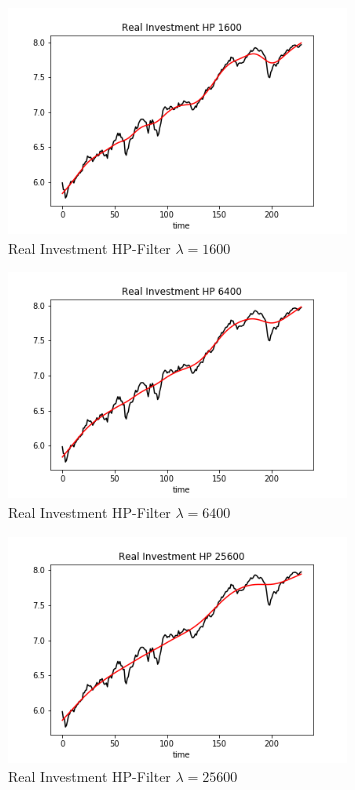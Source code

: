 \documentclass[letterpaper,11pt]{article}
\theoremstyle{definition}
\begin{document}
\begin{spacing}{1.5}
\begin{Exercise}
				\begin{figure}[H]
					\caption{Real Investment HP-Filter $\lambda=1600$}
					\label{fig:real_IN1600}
					\includegraphics[width=0.8\textwidth]{Real_IN_HP1600.png}
				\end{figure}

				\begin{figure}[H]
					\caption{Real Investment HP-Filter $\lambda=6400$}
					\label{fig:real_IN6400}
					\includegraphics[width=0.8\textwidth]{Real_IN_HP6400.png}
				\end{figure}

				\begin{figure}[H]
					\caption{Real Investment HP-Filter $\lambda=25600$}
					\label{fig:real_IN25600}
					\includegraphics[width=0.8\textwidth]{Real_IN_HP25600.png}
				\end{figure}
    \end{Exercise}


\end{spacing}
\end{document}
